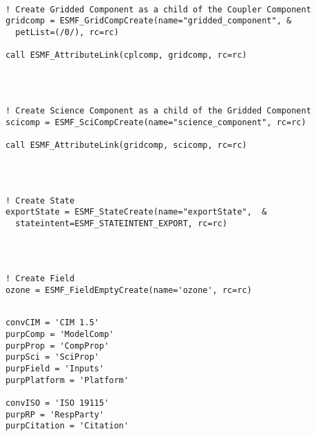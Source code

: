 
 \begin{verbatim}

      ! Create Gridded Component as a child of the Coupler Component
      gridcomp = ESMF_GridCompCreate(name="gridded_component", &
        petList=(/0/), rc=rc)

      call ESMF_AttributeLink(cplcomp, gridcomp, rc=rc)

 
\end{verbatim}
 

 \begin{verbatim}

      ! Create Science Component as a child of the Gridded Component
      scicomp = ESMF_SciCompCreate(name="science_component", rc=rc)

      call ESMF_AttributeLink(gridcomp, scicomp, rc=rc)

 
\end{verbatim}
 

 \begin{verbatim}

      ! Create State
      exportState = ESMF_StateCreate(name="exportState",  &
        stateintent=ESMF_STATEINTENT_EXPORT, rc=rc)
 
\end{verbatim}
 

 \begin{verbatim}


      ! Create Field
      ozone = ESMF_FieldEmptyCreate(name='ozone', rc=rc)
 
\end{verbatim}
 

 \begin{verbatim}
      convCIM = 'CIM 1.5'
      purpComp = 'ModelComp'
      purpProp = 'CompProp'
      purpSci = 'SciProp'
      purpField = 'Inputs'
      purpPlatform = 'Platform'

      convISO = 'ISO 19115'
      purpRP = 'RespParty'
      purpCitation = 'Citation'
 
\end{verbatim}
 
